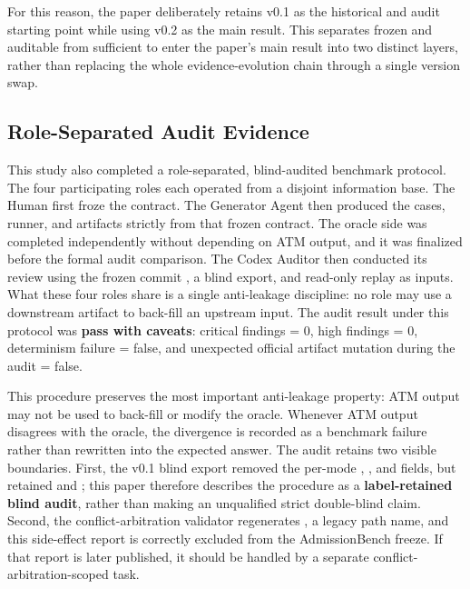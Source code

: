 \documentclass[9pt,letterpaper]{extarticle}
\begin{document}
For this reason, the paper deliberately retains v0.1 as the historical and audit starting point while using v0.2 as the main result. This separates {}frozen and auditable{} from {}sufficient to enter the paper's main result{} into two distinct layers, rather than replacing the whole evidence-evolution chain through a single version swap.

\subsection{Role-Separated Audit Evidence}

This study also completed a role-separated, blind-audited benchmark protocol. The four participating roles each operated from a disjoint information base. The Human first froze the contract. The Generator Agent then produced the cases, runner, and artifacts strictly from that frozen contract. The oracle side was completed independently without depending on ATM output, and it was finalized before the formal audit comparison. The Codex Auditor then conducted its review using the frozen commit \texttt{}, a blind export, and read-only replay as inputs. What these four roles share is a single anti-leakage discipline: no role may use a downstream artifact to back-fill an upstream input. The audit result under this protocol was \textbf{pass with caveats}: critical findings = 0, high findings = 0, determinism failure = false, and unexpected official artifact mutation during the audit = false.

This procedure preserves the most important anti-leakage property: ATM output may not be used to back-fill or modify the oracle. Whenever ATM output disagrees with the oracle, the divergence is recorded as a benchmark failure rather than rewritten into the expected answer. The audit retains two visible boundaries. First, the v0.1 blind export removed the per-mode \texttt{}, \texttt{}, and \texttt{} fields, but retained \texttt{} and \texttt{}; this paper therefore describes the procedure as a \textbf{label-retained blind audit}, rather than making an unqualified strict double-blind claim. Second, the conflict-arbitration validator regenerates \texttt{}, a legacy path name, and this side-effect report is correctly excluded from the AdmissionBench freeze. If that report is later published, it should be handled by a separate conflict-arbitration-scoped task.
\end{document}
